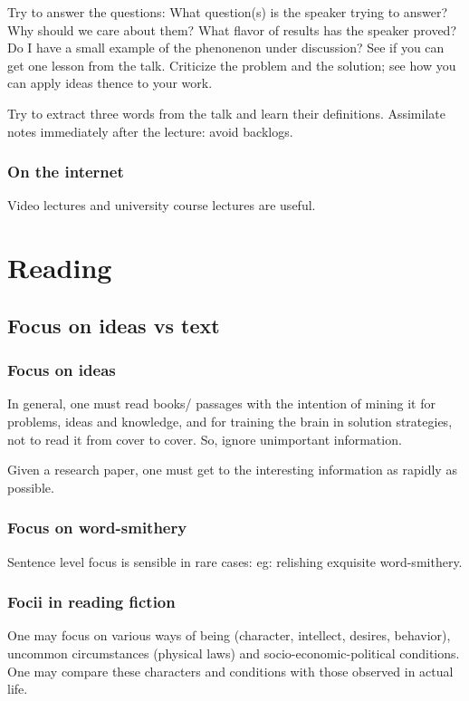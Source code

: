 \documentclass[oneside, article]{memoir}
\begin{document}
Try to answer the questions: What question(s) is the speaker trying to answer? Why should we care about them? What flavor of results has the speaker proved? Do I have a small example of the phenonenon under discussion? See if you can get one lesson from the talk. Criticize the problem and the solution; see how you can apply ideas thence to your work.

Try to extract three words from the talk and learn their definitions.  Assimilate notes immediately after the lecture: avoid backlogs.

\subsection{On the internet}
Video lectures and university course lectures are useful.

\chapter{Reading}
\section{Focus on ideas vs text}
\subsection{Focus on ideas}
In general, one must read books/ passages with the intention of mining it for problems, ideas and knowledge, and for training the brain in solution strategies, not to read it from cover to cover. So, ignore unimportant information.

Given a research paper, one must get to the interesting information as rapidly as possible.

\subsection{Focus on word-smithery}
Sentence level focus is sensible in rare cases: eg: relishing exquisite word-smithery.

\subsection{Focii in reading fiction}
One may focus on various ways of being (character, intellect, desires, behavior), uncommon circumstances (physical laws) and socio-economic-political conditions. One may compare these characters and conditions with those observed in actual life.
\end{document}

